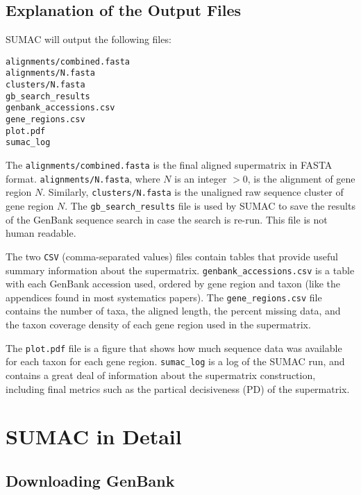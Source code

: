 \documentclass[12pt]{report}
\begin{document}
\section{Explanation of the Output Files}

SUMAC will output the following files:

\begin{verbatim}
alignments/combined.fasta
alignments/N.fasta
clusters/N.fasta
gb_search_results
genbank_accessions.csv
gene_regions.csv
plot.pdf
sumac_log
\end{verbatim}

The \verb|alignments/combined.fasta| is the final aligned supermatrix in FASTA format.
\verb|alignments/N.fasta|, where $N$ is an integer $> 0$, is the alignment of gene region $N$.
Similarly, \verb|clusters/N.fasta| is the unaligned raw sequence cluster of gene region $N$.
The \verb|gb_search_results| file is used by SUMAC to save the results of the GenBank
sequence search in case the search is re-run. This file is not human readable.

The two \verb|CSV| (comma-separated values) files contain tables that provide useful
summary information about the supermatrix. \verb|genbank_accessions.csv| is a table
with each GenBank accession used, ordered by gene region and taxon (like the
appendices found in most systematics papers). The \verb|gene_regions.csv|
file contains the number of taxa, the aligned length, the percent missing data,
and the taxon coverage density of each gene region used in the supermatrix.

The \verb|plot.pdf| file is a figure that shows how much sequence data was available for
each taxon for each gene region.
\verb|sumac_log| is a log of the SUMAC run, and contains a great deal of information
about the supermatrix construction, including final metrics such as the partical
decisiveness (PD) of the supermatrix.




\chapter{SUMAC in Detail}

\section{Downloading GenBank}
\end{document}
